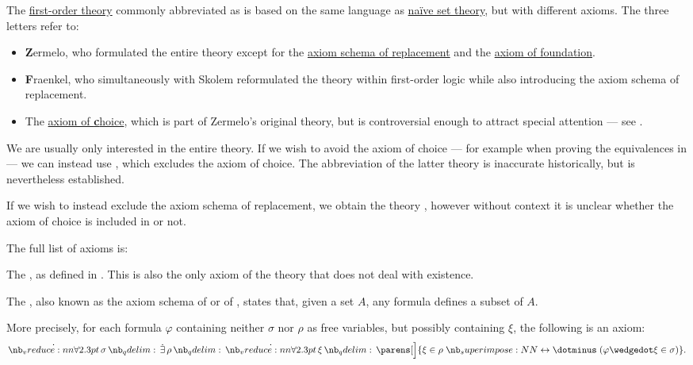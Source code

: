 \begin{definition}\label{def:zfc}
  The \hyperref[def:first_order_theory]{first-order theory} commonly abbreviated as  is based on the same language as \hyperref[def:naive_set_theory]{na\"ive set theory}, but with different axioms. The three letters refer to:
  \begin{itemize}
    \item \textbf{Z}ermelo, who formulated the entire theory except for the \hyperref[def:zfc/replacement]{axiom schema of replacement} and the \hyperref[def:zfc/foundation]{axiom of foundation}.
    \item \textbf{F}raenkel, who simultaneously with Skolem reformulated the theory within first-order logic while also introducing the axiom schema of replacement.
    \item The \hyperref[def:zfc/choice]{axiom of \textbf{c}hoice}, which is part of Zermelo's original theory, but is controversial enough to attract special attention --- see .
  \end{itemize}

  We are usually only interested in the entire theory. If we wish to avoid the axiom of choice --- for example when proving the equivalences in  --- we can instead use , which excludes the axiom of choice. The abbreviation of the latter theory is inaccurate historically, but is nevertheless established.

  If we wish to instead exclude the axiom schema of replacement, we obtain the theory , however without context it is unclear whether the axiom of choice is included in  or not.

  The full list of axioms is:
  \begin{thmenum}
     The , as defined in . This is also the only axiom of the theory that does not deal with existence.

     The , also known as the axiom schema of  or of , states that, given a set \( A \), any formula defines a subset of \( A \).

    More precisely, for each formula \( \varphi \) containing neither \( \sigma \) nor \( \rho \) as free variables, but possibly containing \( \xi \), the following is an axiom:
    \begin{equation}\label{eq:def:zfc/specification}
      \qforall \sigma \qexists \rho \qforall \xi \parens[\Big]{ \xi \in \rho \syniff (\varphi \synwedge \xi \in \sigma) }.
    \end{equation}


\end{thmenum}
\end{definition}
